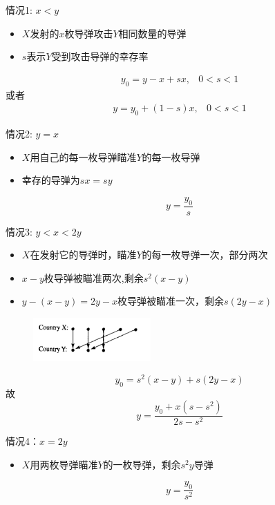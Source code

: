 \documentclass[UTF8]{ctexbeamer}
\begin{document}
\begin{frame}{情况1: $x < y$}
  \begin{itemize}
  \item $X$发射的$x$枚导弹攻击$Y$相同数量的导弹
  \item $s$表示$Y$受到攻击导弹的幸存率
  \end{itemize}
  \[
  \begin{array}{cc}
    y_0 = y - x + sx, & 0 < s < 1
  \end{array}
  \]
  或者
  \[
  \begin{array}{cc}
    y = y_0 +(1-s)x, & 0 < s < 1
  \end{array}
  \]
\end{frame}

\begin{frame}{情况2: $y = x$}
  \begin{itemize}
  \item $X$用自己的每一枚导弹瞄准$Y$的每一枚导弹
  \item 幸存的导弹为$sx = sy$
  \end{itemize}

  \[
  y = \frac{y_0}{s}
  \]
  
\end{frame}

\begin{frame}{情况3: $y < x < 2y$}
  \begin{itemize}
  \item $X$在发射它的导弹时，瞄准$Y$的每一枚导弹一次，部分两次
  \item $x-y$枚导弹被瞄准两次,剩余$s^2(x-y)$
  \item $y-(x-y) = 2y-x$枚导弹被瞄准一次，剩余$s(2y-x)$
  \end{itemize}
  
  \begin{figure}
    \centering
    \includegraphics[width=0.4\textwidth]{neardouble.png}
  \end{figure}
  
  \[
  y_0 = s^2(x-y) + s(2y-x)
  \]
  故
  \[
  y = \frac{y_0 + x(s-s^2)}{2s - s^2}
  \]
\end{frame}

\begin{frame}{情况4：$x=2y$}
  \begin{itemize}
  \item $X$用两枚导弹瞄准$Y$的一枚导弹，剩余$s^2y$导弹
  \end{itemize}
  \[
  y = \frac{y_0}{s^2}
  \]

\end{frame}
\end{document}
